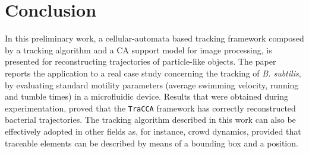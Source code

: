 \documentclass[conference]{IEEEtran}
\begin{document}
\section{Conclusion}\label{conclusions}
In this preliminary work, a cellular-automata based tracking framework composed by a tracking algorithm and a CA support model for image processing, is presented for reconstructing trajectories of particle-like objects. The paper reports the application to a real case study concerning the tracking of \textit{B. subtilis}, by evaluating  standard motility parameters (average swimming velocity, running and tumble times) in a microfluidic device. Results that were obtained during experimentation, proved that the \texttt{TraCCA} framework has correctly reconstructed bacterial trajectories. The tracking algorithm described in this work can also be effectively adopted in other fields as, for instance, crowd dynamics, provided that traceable elements can be described by means of a bounding box and a position.
\end{document}
